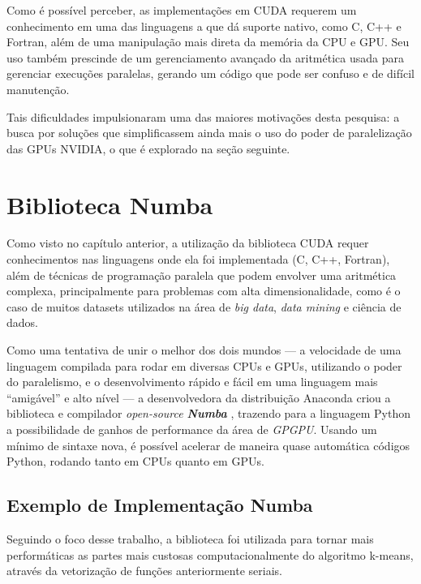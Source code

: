 \documentclass[12pt,
openright, 
oneside, %
a4paper,    %
brazil]{facom-ufu-abntex2}
\begin{document}
Como é possível perceber, as implementações em CUDA requerem um conhecimento em uma das linguagens a que dá suporte nativo, como C, C++ e Fortran, além de uma manipulação mais direta da memória da CPU e GPU. Seu uso também prescinde de um gerenciamento avançado da aritmética usada para gerenciar execuções paralelas, gerando um código que pode ser confuso e de difícil manutenção.

Tais dificuldades impulsionaram uma das maiores motivações desta pesquisa: a busca por soluções que simplificassem ainda mais o uso do poder de paralelização das GPUs NVIDIA, o que é explorado na seção seguinte.




\section{Biblioteca Numba}
\label{sec:numba}

Como visto no capítulo anterior, a utilização da biblioteca CUDA requer conhecimentos nas linguagens onde ela foi implementada (C, C++, Fortran), além de técnicas de programação paralela que podem envolver uma aritmética complexa, principalmente para problemas com alta dimensionalidade, como é o caso de muitos datasets utilizados na área de \textit{big data}, \textit{data mining} e ciência de dados.

Como uma tentativa de unir o melhor dos dois mundos --- a velocidade de uma linguagem compilada para rodar em diversas CPUs e GPUs, utilizando o poder do paralelismo, e o desenvolvimento rápido e fácil em uma linguagem mais \enquote{amigável} e alto nível --- a desenvolvedora da distribuição Anaconda criou a biblioteca e compilador \textit{open-source} \textbf{\textit{Numba}} \cite{numbaHomePage}, trazendo para a linguagem Python a possibilidade de ganhos de performance da área de \textit{GPGPU}. Usando um mínimo de sintaxe nova, é possível acelerar de maneira quase automática códigos Python, rodando tanto em CPUs quanto em GPUs.


\subsection{Exemplo de Implementação Numba}
\label{ssc:implementaçãoNumba}

Seguindo o foco desse trabalho, a biblioteca foi utilizada para tornar mais performáticas as partes mais custosas computacionalmente do algoritmo k-means, através da vetorização de funções anteriormente seriais.
\end{document}
